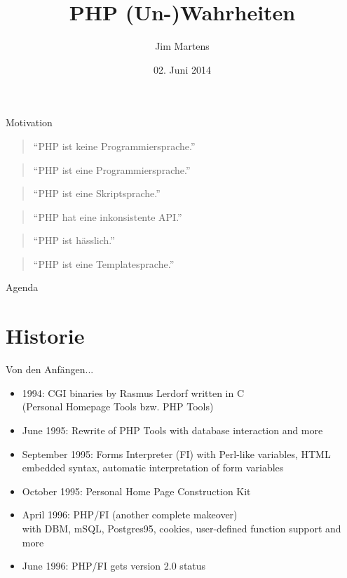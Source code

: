 \documentclass{beamer}
\begin{document}
\author{Jim Martens}
\title{PHP (Un-)Wahrheiten}
\date{02. Juni 2014}

	\begin{frame}
		\titlepage
	\end{frame}
	
	\begin{frame}{Motivation}
		\begin{quotation}
			"`PHP ist keine Programmiersprache."'
		\end{quotation}
			
		\begin{quotation}
			"`PHP ist eine Programmiersprache."'
		\end{quotation}
		
		\begin{quotation}
			"`PHP ist eine Skriptsprache."'
		\end{quotation}
		
		\begin{quotation}
			"`PHP hat eine inkonsistente API."'
		\end{quotation}
		
		\begin{quotation}
			"`PHP ist hässlich."'
		\end{quotation}
		
		\begin{quotation}
			"`PHP ist eine Templatesprache."'
		\end{quotation}
	\end{frame}
	
	\begin{frame}{Agenda}
		\tableofcontents
	\end{frame}
	
	\section{Historie}
	\begin{frame}{Von den Anfängen...}
		\begin{itemize}
			\item 1994: CGI binaries by Rasmus Lerdorf written in C \\ (Personal Homepage Tools bzw. PHP Tools)
			\item June 1995: Rewrite of PHP Tools with database interaction and more
			\item September 1995: Forms Interpreter (FI) with Perl-like variables, HTML embedded syntax, automatic interpretation of form variables
			\item October 1995: Personal Home Page Construction Kit
			\item April 1996: PHP/FI (another complete makeover) \\
			with DBM, mSQL, Postgres95, cookies, user-defined function support and more
			\item June 1996: PHP/FI gets version 2.0 status
		\end{itemize}
	\end{frame}
	
\end{document}

